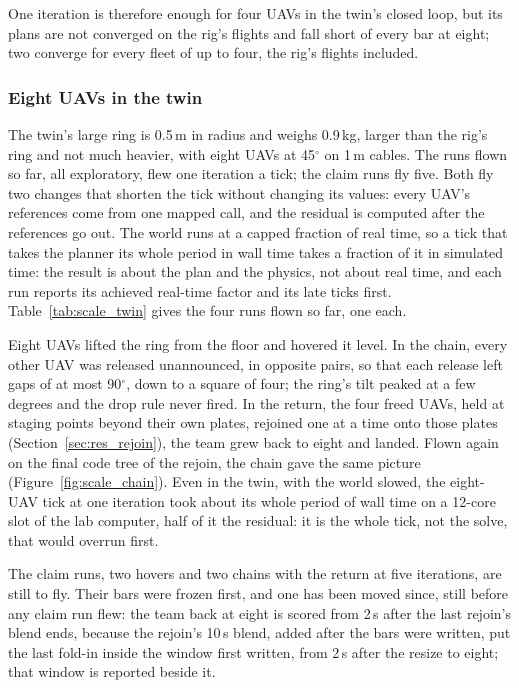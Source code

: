 One iteration is therefore enough for four UAVs in the twin's closed loop, but its plans are not converged on the
rig's flights and fall short of every bar at eight; two converge for every fleet of up to four, the rig's flights
included.

\subsubsection{Eight UAVs in the twin}

The twin's large ring is 0.5\,m in radius and weighs 0.9\,kg, larger than the rig's ring and not much heavier, with
eight UAVs at 45$^\circ$ on 1\,m cables. The runs flown so far, all exploratory, flew one iteration a tick; the claim
runs fly five. Both fly two changes that shorten the tick without changing its values: every UAV's references come
from one mapped call, and the residual is computed after the references go out. The world runs at a capped fraction
of real time, so a tick that takes the planner its whole period in wall time takes a fraction of it in simulated time:
the result is about the plan and the physics, not about real time, and each run reports its achieved real-time factor
and its late ticks first. Table~\ref{tab:scale_twin} gives the four runs flown so far, one each.

Eight UAVs lifted the ring from the floor and hovered it level. In the chain, every other UAV was released
unannounced, in opposite pairs, so that each release left gaps of at most 90$^\circ$, down to a square of four; the
ring's tilt peaked at a few degrees and the drop rule never fired. In the return, the four freed UAVs, held at
staging points beyond their own plates, rejoined one at a time onto those plates (Section~\ref{sec:res_rejoin}), the
team grew back to eight and landed. Flown again on the final code tree of the rejoin, the chain gave the same
picture (Figure~\ref{fig:scale_chain}). Even in the twin, with the world slowed, the eight-UAV tick at one iteration
took about its whole period of wall time on a 12-core slot of the lab computer, half of it the residual: it is the
whole tick, not the solve, that would overrun first.

The claim runs, two hovers and two chains with the return at five iterations, are still to fly. Their bars were
frozen first, and one has been moved since, still before any claim run flew: the team back at eight is scored from
2\,s after the last rejoin's blend ends, because the rejoin's 10\,s blend, added after the bars were written, put the
last fold-in inside the window first written, from 2\,s after the resize to eight; that window is reported beside it.

